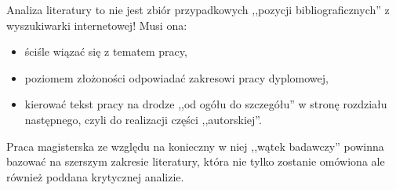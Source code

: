 Analiza literatury to nie jest zbiór przypadkowych ,,pozycji bibliograficznych'' z wyszukiwarki internetowej! Musi ona:

\begin{itemize}
	\item ściśle wiązać się z tematem pracy,
	\item poziomem złożoności odpowiadać zakresowi pracy dyplomowej, 
	\item kierować tekst pracy na drodze ,,od ogółu do szczegółu'' w stronę rozdziału następnego, czyli do realizacji części ,,autorskiej''.
\end{itemize}

Praca magisterska ze względu na konieczny w niej ,,wątek badawczy'' powinna bazować na szerszym zakresie literatury, która nie tylko zostanie omówiona ale również poddana krytycznej analizie.

